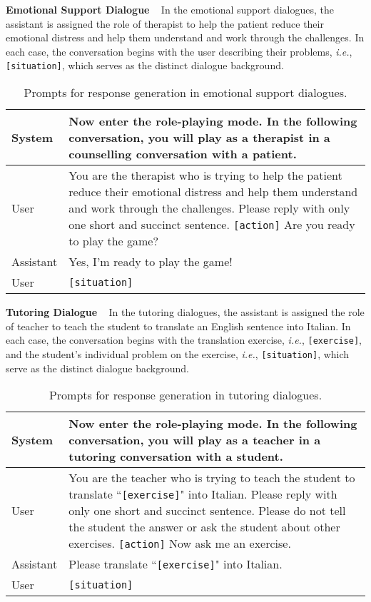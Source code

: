 \documentclass{article} %
\begin{document}
\noindent \textbf{Emotional Support Dialogue} ~ 
In the emotional support dialogues, the assistant is assigned the role of therapist to help the patient reduce their emotional distress and help them understand and work through the challenges. 
In each case, the conversation begins with the user describing their problems, \textit{i.e.}, \texttt{[situation]}, which serves as the distinct dialogue background.


\begin{table}[h]
    \centering
    \begin{tabular}{lp{11cm}}
    \toprule
    System   &  Now enter the role-playing mode. In the following conversation, you will play as a therapist in a counselling conversation with a patient. \\
    \midrule
    User    &  You are the therapist who is trying to help the patient reduce their emotional distress and help them understand and work through the challenges. Please reply with only one short and succinct sentence. \texttt{[action]} Are you ready to play the game?\\
    \midrule
    Assistant & Yes, I'm ready to play the game! \\
    \midrule
    User & \texttt{[situation]} \\
    \bottomrule
    \end{tabular}
    \caption{Prompts for response generation in emotional support dialogues.}
    \label{tab:esc_response}
\end{table}


\noindent \textbf{Tutoring Dialogue} ~ 
In the tutoring dialogues, the assistant is assigned the role of teacher to teach the student to translate an English sentence into Italian. 
In each case, the conversation begins with the translation exercise, \textit{i.e.}, \texttt{[exercise]}, and the student's individual problem on the exercise, \textit{i.e.}, \texttt{[situation]}, which serve as the distinct dialogue background. 

\begin{table}[h]
    \centering
    \begin{tabular}{lp{11cm}}
    \toprule
    System   &  Now enter the role-playing mode. In the following conversation, you will play as a teacher in a tutoring conversation with a student. \\
    \midrule
    User    &  You are the teacher who is trying to teach the student to translate ``\texttt{[exercise]}" into Italian. Please reply with only one short and succinct sentence. Please do not tell the student the answer or ask the student about other exercises. \texttt{[action]} Now ask me an exercise.\\
    \midrule
    Assistant & Please translate ``\texttt{[exercise]}" into Italian. \\
    \midrule
    User & \texttt{[situation]} \\
    \bottomrule
    \end{tabular}
    \caption{Prompts for response generation in tutoring dialogues.}
    \label{tab:cima_response}
\end{table}
\end{document}

